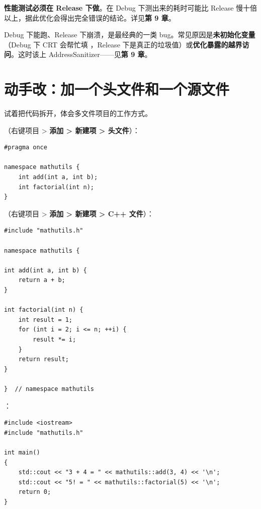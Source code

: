 \begin{warnbox}[注意]
\textbf{性能测试必须在 Release 下做}。在 Debug 下测出来的耗时可能比 Release 慢十倍以上，据此优化会得出完全错误的结论。详见\textbf{第 9 章}。
\end{warnbox}

\begin{keybox}[实战场景]
Debug 下能跑、Release 下崩溃，是最经典的一类 bug。常见原因是\textbf{未初始化变量}（Debug 下 CRT 会帮忙填 ，Release 下是真正的垃圾值）或\textbf{优化暴露的越界访问}。这时该上 AddressSanitizer——见\textbf{第 9 章}。
\end{keybox}

\section{动手改：加一个头文件和一个源文件}

试着把代码拆开，体会多文件项目的工作方式。

\textbf{}（右键项目 > \textbf{添加 > 新建项 > 头文件}）：

\begin{lstlisting}[style=cppstyle]
#pragma once

namespace mathutils {
    int add(int a, int b);
    int factorial(int n);
}
\end{lstlisting}

\textbf{}（右键项目 > \textbf{添加 > 新建项 > C++ 文件}）：

\begin{lstlisting}[style=cppstyle]
#include "mathutils.h"

namespace mathutils {

int add(int a, int b) {
    return a + b;
}

int factorial(int n) {
    int result = 1;
    for (int i = 2; i <= n; ++i) {
        result *= i;
    }
    return result;
}

}  // namespace mathutils
\end{lstlisting}

\textbf{}：

\begin{lstlisting}[style=cppstyle]
#include <iostream>
#include "mathutils.h"

int main()
{
    std::cout << "3 + 4 = " << mathutils::add(3, 4) << '\n';
    std::cout << "5! = " << mathutils::factorial(5) << '\n';
    return 0;
}
\end{lstlisting}

